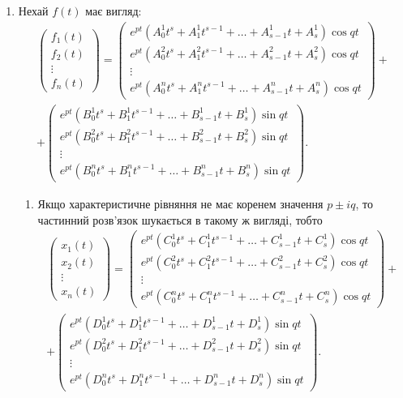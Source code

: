 \begin{enumerate}
	\item Нехай $f(t)$ має вигляд:
	\begin{multline*}
		\begin{pmatrix} f_1(t) \\ f_2(t) \\ \vdots \\ f_n(t) \end{pmatrix} =
		\begin{pmatrix} e^{pt} (A_0^1 t^s + A_1^1 t^{s - 1} + \ldots + A_{s - 1}^1 t + A_s^1) \cos qt \\ e^{pt} (A_0^2 t^s + A_1^2 t^{s - 1} + \ldots + A_{s - 1}^2 t + A_s^2) \cos qt \\ \vdots \\ e^{pt} (A_0^n t^s + A_1^n t^{s - 1} + \ldots + A_{s - 1}^n t + A_s^n) \cos qt \end{pmatrix} + \\
		+ \begin{pmatrix} e^{pt} (B_0^1 t^s + B_1^1 t^{s - 1} + \ldots + B_{s - 1}^1 t + B_s^1) \sin qt \\ e^{pt} (B_0^2 t^s + B_1^2 t^{s - 1} + \ldots + B_{s - 1}^2 t + B_s^2) \sin qt \\ \vdots \\ e^{pt} (B_0^n t^s + B_1^n t^{s - 1} + \ldots + B_{s - 1}^n t + B_s^n) \sin qt \end{pmatrix}.
	\end{multline*}

 
	\begin{enumerate}
		\item Якщо характеристичне рівняння не має коренем значення $p \pm i q$, то частинний розв'язок шукається в такому ж вигляді, тобто
		\begin{multline*}
			\begin{pmatrix} x_1(t) \\ x_2(t) \\ \vdots \\ x_n(t) \end{pmatrix} =
			\begin{pmatrix} e^{pt} (C_0^1 t^s + C_1^1 t^{s - 1} + \ldots + C_{s - 1}^1 t + C_s^1) \cos qt \\ e^{pt} (C_0^2 t^s + C_1^2 t^{s - 1} + \ldots + C_{s - 1}^2 t + C_s^2) \cos qt \\ \vdots \\ e^{pt} (C_0^n t^s + C_1^n t^{s - 1} + \ldots + C_{s - 1}^n t + C_s^n) \cos qt \end{pmatrix} + \\
			+ \begin{pmatrix} e^{pt} (D_0^1 t^s + D_1^1 t^{s - 1} + \ldots + D_{s - 1}^1 t + D_s^1) \sin qt \\ e^{pt} (D_0^2 t^s + D_1^2 t^{s - 1} + \ldots + D_{s - 1}^2 t + D_s^2) \sin qt \\ \vdots \\ e^{pt} (D_0^n t^s + D_1^n t^{s - 1} + \ldots + D_{s - 1}^n t + D_s^n) \sin qt \end{pmatrix}.
		\end{multline*}
 

\end{enumerate}
\end{enumerate}
